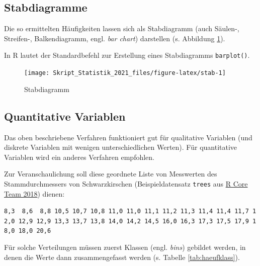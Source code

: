 \documentclass[
  11pt,
  ngerman,
  a4paper,
]{report}
\newenvironment{rtip}{
  \medskip
  \begin{tcolorbox}[colframe=purple,colback=light_gray,title=Softwarehinweis]
}{
  \end{tcolorbox}
  \medskip
}
\begin{document}
\hypertarget{stabdiagramme}{%
\subsection{Stabdiagramme}\label{stabdiagramme}}

Die so ermittelten Häufigkeiten lassen sich als Stabdiagramm (auch Säulen-, Streifen-, Balkendiagramm, engl. \emph{bar chart}) darstellen (s. Abbildung \ref{fig:stab}).

\begin{rtip}
In R lautet der Standardbefehl zur Erstellung eines Stabdiagramms \verb|barplot()|.
\end{rtip}

\begin{figure}[!h]

{\centering \texttt{[image: Skript\_Statistik\_2021\_files/figure-latex/stab-1]} 

}

\caption{Stabdiagramm}\label{fig:stab}
\end{figure}

\hypertarget{quantitative-variablen-1}{%
\subsection{Quantitative Variablen}\label{quantitative-variablen-1}}

Das oben beschriebene Verfahren funktioniert gut für qualitative Variablen (und diskrete Variablen mit wenigen unterschiedlichen Werten). Für quantitative Variablen wird ein anderes Verfahren empfohlen.

Zur Veranschaulichung soll diese geordnete Liste von Messwerten des Stammdurchmessers von Schwarzkirschen (Beispieldatensatz \texttt{trees} aus \protect\hyperlink{ref-r}{R Core Team 2018}) dienen:

\texttt{8,3\ \ 8,6\ \ 8,8\ 10,5\ 10,7\ 10,8\ 11,0\ 11,0\ 11,1\ 11,2\ 11,3\ 11,4\ 11,4\ 11,7\ 12,0\ 12,9\ 12,9\ 13,3\ 13,7\ 13,8\ 14,0\ 14,2\ 14,5\ 16,0\ 16,3\ 17,3\ 17,5\ 17,9\ 18,0\ 18,0\ 20,6}

Für solche Verteilungen müssen zuerst Klassen (engl. \emph{bins}) gebildet werden, in denen die Werte dann zusammengefasst werden (s. Tabelle \ref{tab:haeufklass}).
\end{document}

